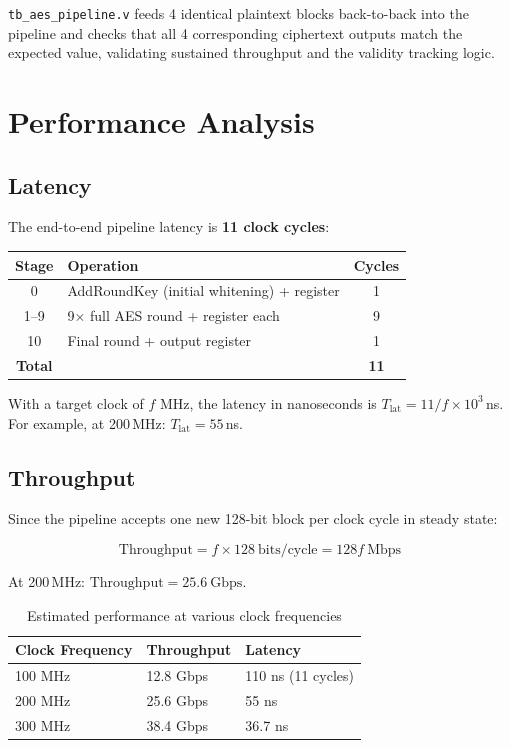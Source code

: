 \documentclass[12pt,a4paper]{article}
\begin{document}
\texttt{tb\_aes\_pipeline.v} feeds 4 identical plaintext blocks
back-to-back into the pipeline and checks that all 4 corresponding
ciphertext outputs match the expected value, validating sustained
throughput and the validity tracking logic.

\section{Performance Analysis}

\subsection{Latency}

The end-to-end pipeline latency is \textbf{11 clock cycles}:

\begin{center}
\begin{tabular}{@{}clc@{}}
\toprule
\textbf{Stage} & \textbf{Operation} & \textbf{Cycles}\\
\midrule
0   & AddRoundKey (initial whitening) + register & 1\\
1--9 & 9$\times$ full AES round + register each & 9\\
10  & Final round + output register              & 1\\
\midrule
\textbf{Total} & & \textbf{11}\\
\bottomrule
\end{tabular}
\end{center}

With a target clock of $f$ MHz, the latency in nanoseconds is
$T_\text{lat} = 11 / f \times 10^3$\,ns. For example, at 200\,MHz:
$T_\text{lat} = 55$\,ns.

\subsection{Throughput}

Since the pipeline accepts one new 128-bit block per clock cycle in steady
state:

\[
\text{Throughput} = f \times 128\ \text{bits/cycle} = 128f\ \text{Mbps}
\]

At 200\,MHz: $\text{Throughput} = 25.6\ \text{Gbps}$.

\begin{table}[H]
\centering
\begin{tabular}{@{}lll@{}}
\toprule
\textbf{Clock Frequency} & \textbf{Throughput} & \textbf{Latency}\\
\midrule
100 MHz & 12.8 Gbps & 110 ns (11 cycles)\\
200 MHz & 25.6 Gbps & 55 ns\\
300 MHz & 38.4 Gbps & 36.7 ns\\
\bottomrule
\end{tabular}
\caption{Estimated performance at various clock frequencies}
\end{table}
\end{document}
